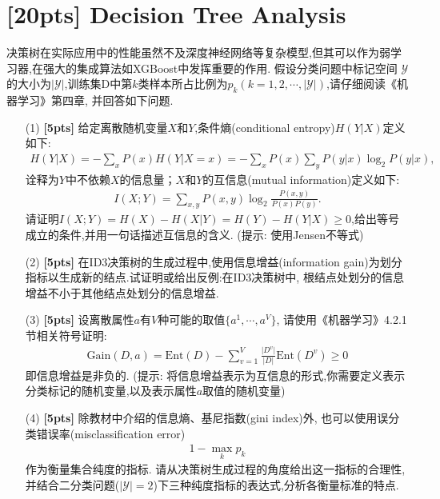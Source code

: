 \documentclass[a4paper,UTF8]{article}
\numberwithin{equation}{section}
\theoremstyle{definition}
\begin{document}
\section{[20pts] Decision Tree Analysis}
决策树在实际应用中的性能虽然不及深度神经网络等复杂模型,但其可以作为弱学习器,在强大的集成算法如XGBoost中发挥重要的作用. 假设分类问题中标记空间 $\mathcal{Y}$ 的大小为$|\mathcal{Y}|$,训练集D中第$k$类样本所占比例为$p
_k(k=1,2,\cdots,|\mathcal{Y}|)$,请仔细阅读《机器学习》第四章, 并回答如下问题.
\begin{enumerate}
	\item[(1)] \textbf{[5pts]} 给定离散随机变量$X$和$Y$,条件熵(conditional entropy)$H(Y|X)$定义如下:
	\begin{align*}
		H(Y|X) = -\sum_{x}P(x)H(Y|X=x) = -\sum_{x}P(x)\sum_{y}P(y|x)\log_2 P(y|x),
	\end{align*}
	诠释为$Y$中不依赖$X$的信息量；$X$和$Y$的互信息(mutual information)定义如下:
	\begin{align*}
		I(X;Y) = \sum_{x,y} P(x,y) \log_2 \frac{P(x,y)}{P(x)P(y)}.
	\end{align*}
	请证明$I(X;Y) = H(X) - H(X|Y) = H(Y) - H(Y|X) \geq 0$,给出等号成立的条件,并用一句话描述互信息的含义.
	(提示: 使用Jensen不等式)
	\item[(2)] \textbf{[5pts]} 在ID3决策树的生成过程中,使用信息增益(information gain)为划分指标以生成新的结点.试证明或给出反例:在ID3决策树中, 根结点处划分的信息增益不小于其他结点处划分的信息增益.
	\item[(3)] \textbf{[5pts]} 设离散属性$a$有$V$种可能的取值$\{a^1,\cdots,a^V\}$, 请使用《机器学习》4.2.1节相关符号证明:
	\begin{align*}
		\text{Gain}(D,a) = \text{Ent}(D) - \sum_{v=1}^V \frac{\lvert D^v\rvert}{\lvert D \rvert} \text{Ent}(D^v) \geq 0
	\end{align*}
	即信息增益是非负的. (提示: 将信息增益表示为互信息的形式,你需要定义表示分类标记的随机变量,以及表示属性$a$取值的随机变量)
	\item[(4)] \textbf{[5pts]} 除教材中介绍的信息熵、基尼指数(gini index)外, 也可以使用误分类错误率(misclassification error)
	\begin{align*}
		1 - \max_{k} p_k
	\end{align*}
	作为衡量集合纯度的指标. 请从决策树生成过程的角度给出这一指标的合理性,并结合二分类问题($\lvert \mathcal{Y} \rvert = 2$)下三种纯度指标的表达式,分析各衡量标准的特点.
\end{enumerate}
\end{document}
